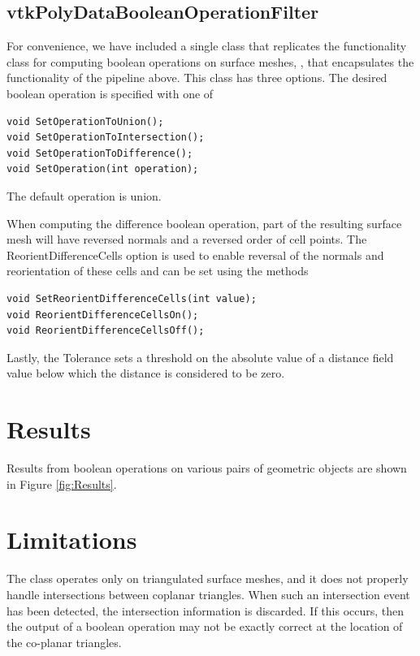 \documentclass{InsightArticle}
\begin{document}
\subsection{vtkPolyDataBooleanOperationFilter}

For convenience, we have included a single class that replicates the functionality  class for computing boolean operations on surface meshes, , that encapsulates the functionality of the pipeline above. This class has three options. The desired boolean operation is specified with one of
\begin{verbatim}
void SetOperationToUnion();
void SetOperationToIntersection();
void SetOperationToDifference();
void SetOperation(int operation);
\end{verbatim}
The default operation is union.

When computing the difference boolean operation, part of the resulting surface mesh will have reversed normals and a reversed order of cell points. The ReorientDifferenceCells option is used to enable reversal of the normals and reorientation of these cells and can be set using the methods
\begin{verbatim}
void SetReorientDifferenceCells(int value);
void ReorientDifferenceCellsOn();
void ReorientDifferenceCellsOff();
\end{verbatim} 

Lastly, the Tolerance sets a threshold on the absolute value of a distance field value below which the distance is considered to be zero.
\section{Results}

Results from boolean operations on various pairs of geometric objects are shown in Figure \ref{fig:Results}.

%

\section{Limitations}

The  class operates only on triangulated surface meshes, and it does not properly handle intersections between coplanar triangles. When such an intersection event has been detected, the intersection information is discarded. If this occurs, then the output of a boolean operation may not be exactly correct at the location of the co-planar triangles.
\end{document}
